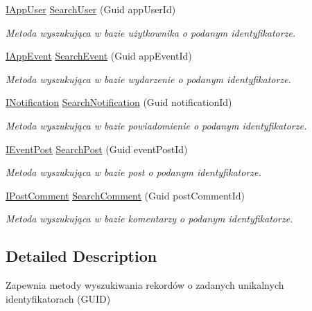 \begin{DoxyCompactItemize}
\item 
\hyperlink{interface_contract_1_1_i_app_user}{I\+App\+User} \hyperlink{interface_contract_1_1_i_search_helper_a94caeabc4d085d4d9fe20a30b64f64b2}{Search\+User} (Guid app\+User\+Id)
\begin{DoxyCompactList}\small\item\em Metoda wyszukująca w bazie użytkownika o podanym identyfikatorze. \end{DoxyCompactList}\item 
\hyperlink{interface_contract_1_1_i_app_event}{I\+App\+Event} \hyperlink{interface_contract_1_1_i_search_helper_ab22158401db3a5d83acd9ac12c43f6ed}{Search\+Event} (Guid app\+Event\+Id)
\begin{DoxyCompactList}\small\item\em Metoda wyszukująca w bazie wydarzenie o podanym identyfikatorze. \end{DoxyCompactList}\item 
\hyperlink{interface_contract_1_1_i_notification}{I\+Notification} \hyperlink{interface_contract_1_1_i_search_helper_a21c140b1dd02497a486a6cc79893f98b}{Search\+Notification} (Guid notification\+Id)
\begin{DoxyCompactList}\small\item\em Metoda wyszukująca w bazie powiadomienie o podanym identyfikatorze. \end{DoxyCompactList}\item 
\hyperlink{interface_contract_1_1_i_event_post}{I\+Event\+Post} \hyperlink{interface_contract_1_1_i_search_helper_a96eedd48e8e11c90080969f0cff04a2b}{Search\+Post} (Guid event\+Post\+Id)
\begin{DoxyCompactList}\small\item\em Metoda wyszukująca w bazie post o podanym identyfikatorze. \end{DoxyCompactList}\item 
\hyperlink{interface_contract_1_1_i_post_comment}{I\+Post\+Comment} \hyperlink{interface_contract_1_1_i_search_helper_a2a8b67f56c6f4f63533a033e44fa2691}{Search\+Comment} (Guid post\+Comment\+Id)
\begin{DoxyCompactList}\small\item\em Metoda wyszukująca w bazie komentarzy o podanym identyfikatorze. \end{DoxyCompactList}\end{DoxyCompactItemize}


\subsection{Detailed Description}
Zapewnia metody wyszukiwania rekordów o zadanych unikalnych identyfikatorach (G\+U\+I\+D) 



